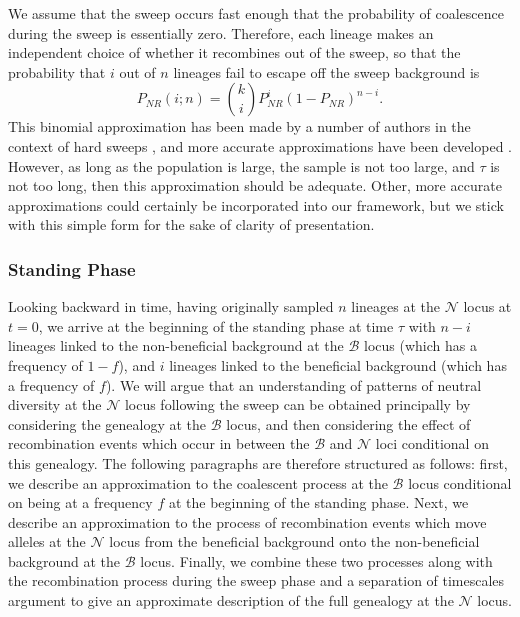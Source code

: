 \documentclass[a4paper,10pt]{article}
\newcommand{\fancyN}{$\mathcal N$ }
\newcommand{\fancyB}{$\mathcal B$ }
\begin{document}
We assume that the sweep occurs fast enough that the probability of coalescence during the sweep is essentially zero. Therefore, each lineage makes an independent choice of whether it recombines out of the sweep, so that the probability that $i$ out of $n$ lineages fail to escape off the sweep background is
\begin{equation}
P_{NR}(i;n) = {k \choose i} P_{NR}^{i} (1-P_{NR})^{n-i}.
\end{equation}
This binomial approximation has been made by a number of authors in the context of hard sweeps \citep{Barton}, and more accurate approximations have been developed \citep{Etheridge2006}. However, as long as the population is large, the sample is not too large,  and $\tau$ is not too long, then this approximation should be adequate. Other, more accurate approximations could certainly be incorporated into our framework, but we stick with this simple form for the sake of clarity of presentation.




\subsubsection{Standing Phase}
Looking backward in time, having originally sampled $n$ lineages at the \fancyN locus at $t=0$, we arrive at the beginning of the standing phase at time $\tau$ with $n-i$ lineages linked to the non-beneficial background at the \fancyB locus (which has a frequency of $1-f$), and $i$ lineages linked to the beneficial background (which has a frequency of $f$). We will argue that an understanding of patterns of neutral diversity at the \fancyN locus following the sweep can be obtained principally by considering the genealogy at the \fancyB locus, and then considering the effect of recombination events which occur in between the \fancyB and \fancyN loci conditional on this genealogy. The following paragraphs are therefore structured as follows: first, we describe an approximation to the coalescent process at the \fancyB locus conditional on being at a frequency $f$ at the beginning of the standing phase. Next, we describe an approximation to the process of recombination events which move alleles at the \fancyN locus from the beneficial background onto the non-beneficial background at the \fancyB locus. Finally, we combine these two processes along with the recombination process during the sweep phase and a separation of timescales argument to give an approximate description of the full genealogy at the \fancyN locus.
\end{document}
